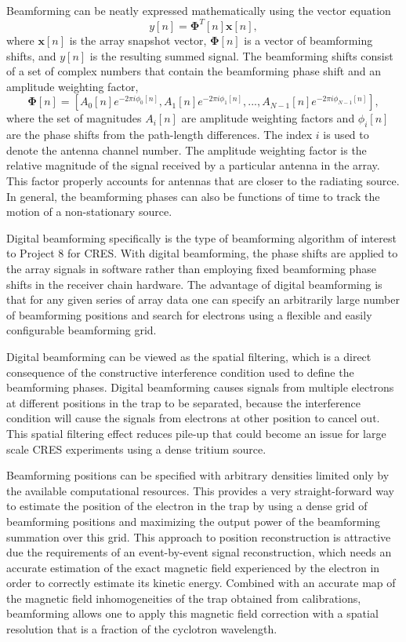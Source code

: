Beamforming can be neatly expressed mathematically using the vector equation
\begin{equation}
    y[n] = \bm{\Phi}^T[n]\bm{x}[n],
\end{equation}
where $\bm{x}[n]$ is the array snapshot vector, $\bm{\Phi}[n]$ is a vector of beamforming shifts, and $y[n]$ is the resulting summed signal. The beamforming shifts consist of a set of complex numbers that contain the beamforming phase shift and an amplitude weighting factor,
\begin{equation}
    \bm{\Phi}[n] = \left[A_0[n]e^{-2\pi i\phi_0[n]}, A_1[n]e^{-2\pi i \phi_1[n]}, ..., A_{N-1}[n]e^{-2\pi i \phi_{N-1}[n]}\right],
\end{equation}
where the set of magnitudes $A_i[n]$ are amplitude weighting factors and $\phi_i[n]$ are the phase shifts from the path-length differences. The index $i$ is used to denote the antenna channel number. The amplitude weighting factor is the relative magnitude of the signal received by a particular antenna in the array. This factor properly accounts for antennas that are closer to the radiating source. In general, the beamforming phases can also be functions of time to track the motion of a non-stationary source.

Digital beamforming specifically is the type of beamforming algorithm of interest to Project 8 for CRES. With digital beamforming, the phase shifts are applied to the array signals in software rather than employing fixed beamforming phase shifts in the receiver chain hardware. The advantage of digital beamforming is that for any given series of array data one can specify an arbitrarily large number of beamforming positions and search for electrons using a flexible and easily configurable beamforming grid.

Digital beamforming can be viewed as the spatial filtering, which is a direct consequence of the constructive interference condition used to define the beamforming phases. Digital beamforming causes signals from multiple electrons at different positions in the trap to be separated, because the interference condition will cause the signals from electrons at other position to cancel out. This spatial filtering effect reduces pile-up that could become an issue for large scale CRES experiments using a dense tritium source.

Beamforming positions can be specified with arbitrary densities limited only by the available computational resources. This provides a very straight-forward way to estimate the position of the electron in the trap by using a dense grid of beamforming positions and maximizing the output power of the beamforming summation over this grid. This approach to position reconstruction is attractive due the requirements of an event-by-event signal reconstruction, which needs an accurate estimation of the exact magnetic field experienced by the electron in order to correctly estimate its kinetic energy. Combined with an accurate map of the magnetic field inhomogeneities of the trap obtained from calibrations, beamforming allows one to apply this magnetic field correction with a spatial resolution that is a fraction of the cyclotron wavelength.

